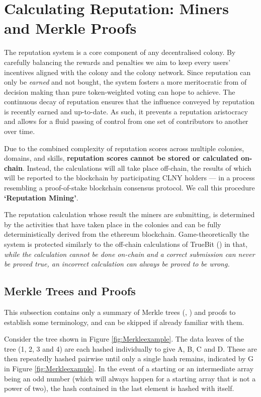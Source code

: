 
\section{Calculating Reputation: Miners and Merkle Proofs}\label{sec:reputationmining}
The reputation system is a core component of any decentralised colony. By carefully balancing the rewards and penalties we aim to keep every users' incentives aligned with the colony and the colony network. Since reputation can only be \emph{earned} and not bought, the system fosters a more meritocratic from of decision making than pure token-weighted voting can hope to achieve. The continuous decay of reputation ensures that the influence conveyed by reputation is recently earned and up-to-date. As such, it prevents a reputation aristocracy and allows for a fluid passing of control from one set of contributors to another over time.


Due to the combined complexity of reputation scores across multiple colonies, domains, and skills,
\textbf{reputation scores cannot be stored or calculated on-chain}. Instead, the calculations will all take place off-chain, the results of which will be reported to the blockchain by participating CLNY holders --- in a process resembling a proof-of-stake blockchain consensus protocol. We call this procedure \textbf{`Reputation Mining'}.

The reputation calculation whose result the miners are submitting, is determined by the activities that have taken place in the colonies and can be fully deterministically derived from the ethereum blockchain. Game-theoretically the system is protected similarly to the off-chain calculations of TrueBit (\cite{TruebitWhitepaper}) in that, \emph{while the calculation cannot be done on-chain and a correct submission can never be proved true, an incorrect calculation can always be proved to be wrong.}


\subsection{Merkle Trees and Proofs}\label{sec:Merkle-summary}
This subsection contains only a summary of Merkle trees (\cite{MerkleTrees}, \cite{MerkleInEthereum}) and proofs to establish some terminology, and can be skipped if already familiar with them.

Consider the tree shown in Figure \ref{fig:Merkleexample}. The data leaves of the tree (1, 2, 3 and 4) are each hashed individually to give A, B, C and D. These are then repeatedly hashed pairwise until only a single hash remains, indicated by G in Figure \ref{fig:Merkleexample}. In the event of a starting or an intermediate array being an odd number (which will always happen for a starting array that is not a power of two), the hash contained in the last element is hashed with itself. 

